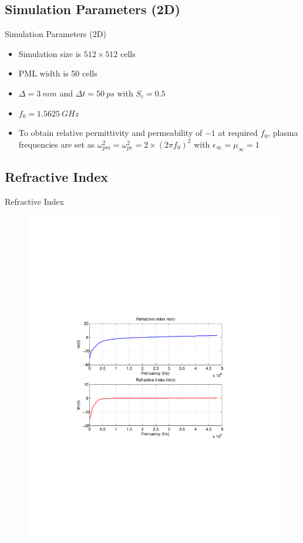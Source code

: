 \documentclass{beamer}
\begin{document}
\subsection{Simulation Parameters (2D)}
\begin{frame}{Simulation Parameters (2D)}
	\begin{itemize}
	\item Simulation size is $512\times 512$ cells
	\item PML width is 50 cells
	\item $\Delta = 3~mm$ and $\Delta t = 50~ps$ with $S_c=0.5$
	\item $f_0=1.5625~GHz$
	\item  To obtain relative permittivity and permeability of $-1$ at required $f_0$, plasma frequencies are set as $\omega^2_{pm}=\omega^2_{pe}=2\times(2\pi f_0)^2$ with $\epsilon_\infty=\mu_\infty=1$
	\end{itemize}
\end{frame}
\subsection{Refractive Index}
\begin{frame}{Refractive Index}
\begin{figure}[H]
\centering
\includegraphics[scale=0.5, trim=3.5cm 8.7cm 4.5cm 8.85cm, clip]{Figures/FigCh03_2DDNGRefractiveIndex.pdf}
\label{fig:2DDNG-Refractive-Index}
\end{figure}
\end{frame}
\end{document}
